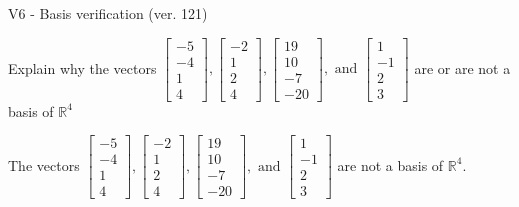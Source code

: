 \begin{exercise}
  \begin{exerciseTitle}V6 - Basis verification (ver. 121)\end{exerciseTitle}
  \begin{exerciseStatement}
    Explain why the vectors \(\left[\begin{array}{r}
-5 \\
-4 \\
1 \\
4
\end{array}\right] , \left[\begin{array}{r}
-2 \\
1 \\
2 \\
4
\end{array}\right] , \left[\begin{array}{r}
19 \\
10 \\
-7 \\
-20
\end{array}\right] , \text{ and } \left[\begin{array}{r}
1 \\
-1 \\
2 \\
3
\end{array}\right]\) are or are not a basis of \(\mathbb{R}^4\)	


  \end{exerciseStatement}
  \begin{exerciseAnswer}
   The vectors \(\left[\begin{array}{r}
-5 \\
-4 \\
1 \\
4
\end{array}\right] , \left[\begin{array}{r}
-2 \\
1 \\
2 \\
4
\end{array}\right] , \left[\begin{array}{r}
19 \\
10 \\
-7 \\
-20
\end{array}\right] , \text{ and } \left[\begin{array}{r}
1 \\
-1 \\
2 \\
3
\end{array}\right]\) 
  	 are not  a basis of \(\mathbb{R}^4\).
  


  \end{exerciseAnswer}
\end{exercise}